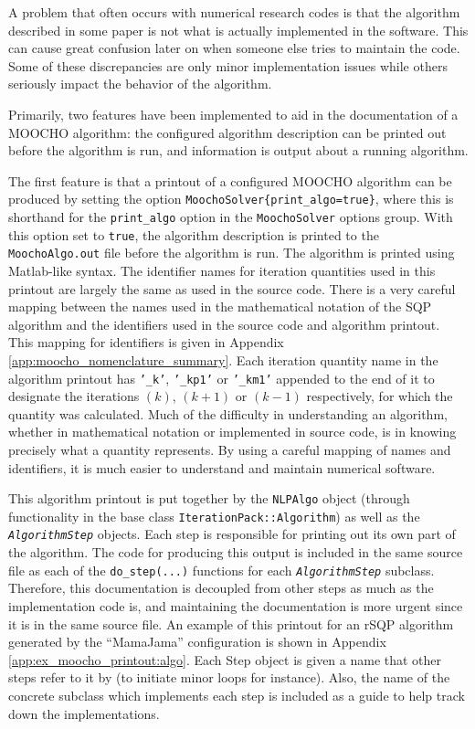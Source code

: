 \documentclass[pdf,ps2pdf,11pt]{SANDreport}
\begin{document}
A problem that often occurs with numerical research codes is that the
algorithm described in some paper is not what is actually implemented in the
software.  This can cause great confusion later on when someone else tries to
maintain the code.  Some of these discrepancies are only minor implementation
issues while others seriously impact the behavior of the algorithm.

Primarily, two features have been implemented to aid in the documentation of a
MOOCHO algorithm: the configured algorithm description can be printed out
before the algorithm is run, and information is output about a running
algorithm.

The first feature is that a printout of a configured MOOCHO algorithm can be
produced by setting the option
{}\texttt{Moocho\-Solver\{\-print\-\_algo\-=true\-\}}, where this is shorthand
for the {}\texttt{print\-\_algo} option in the {}\texttt{Moocho\-Solver}
options group.  With this option set to {}\texttt{true}, the algorithm
description is printed to the {}\texttt{MoochoAlgo.out} file before the
algorithm is run.  The algorithm is printed using Matlab-like syntax.  The
identifier names for iteration quantities used in this printout are largely
the same as used in the source code.  There is a very careful mapping between
the names used in the mathematical notation of the SQP algorithm and the
identifiers used in the source code and algorithm printout.  This mapping for
identifiers is given in Appendix {}\ref{app:moocho_nomenclature_summary}.
Each iteration quantity name in the algorithm printout has {}\texttt{'\_k'},
{}\texttt{'\_kp1'} or {}\texttt{'\_km1'} appended to the end of it to
designate the iterations $(k)$, $(k+1)$ or $(k-1)$ respectively, for which the
quantity was calculated.  Much of the difficulty in understanding an
algorithm, whether in mathematical notation or implemented in source code, is
in knowing precisely what a quantity represents.  By using a careful mapping
of names and identifiers, it is much easier to understand and maintain
numerical software.

This algorithm printout is put together by the {}\texttt{NLP\-Algo} object
(through functionality in the base class
{}\texttt{Iteration\-Pack\-::Algorithm}) as well as the
{}\textit{\texttt{Algorithm\-Step}} objects.  Each step is responsible for
printing out its own part of the algorithm.  The code for producing this
output is included in the same source file as each of the
{}\texttt{do\_step(...)}  functions for each {}\textit{\texttt{AlgorithmStep}}
subclass.  Therefore, this documentation is decoupled from other steps as much
as the implementation code is, and maintaining the documentation is more
urgent since it is in the same source file.  An example of this printout for
an rSQP algorithm generated by the ``MamaJama'' configuration is shown in
Appendix {}\ref{app:ex_moocho_printout:algo}.  Each Step object is given a name
that other steps refer to it by (to initiate minor loops for instance).  Also,
the name of the concrete subclass which implements each step is included as a
guide to help track down the implementations.
\end{document}
